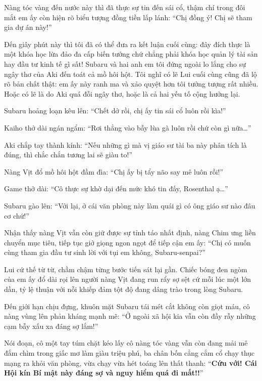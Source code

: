 \documentclass[../main.tex]{subfiles}
\begin{document}

Nàng tóc vàng đến nước này thì đã thực sự tin đến sái cổ, thậm chí trong đôi mắt em ấy còn hiện rõ biểu tượng đồng tiền lấp lánh: ``Chị đồng ý! Chị sẽ tham gia dự án này!''

Đến giây phút này thì tôi đã có thể đưa ra kết luận cuối cùng: đây đích thực là một khóa học lừa đảo đa cấp biến tướng chứ chẳng phải khóa học quản lý tài sản hay đầu tư kinh tế gì sất! Subaru và hai anh em tôi đứng ngoài lo lắng cho sự ngây thơ của Aki đến toát cả mồ hôi hột. Tôi nghĩ có lẽ Lui cuối cùng cũng đã lộ rõ bản chất thật: em ấy này ranh ma và xảo quyệt hơn tôi tưởng tượng rất nhiều. Hoặc có lẽ là do Aki quá đỗi ngây thơ, hoặc là cả hai yếu tố cộng hưởng lại.

Subaru hoảng loạn kêu lên: ``Chết dở rồi, chị ấy tin sái cổ luôn rồi kìa!''

Kaiho thở dài ngán ngẩm: ``Rơi thẳng vào bẫy lùa gà luôn rồi chứ còn gì nữa\dots''

Aki chắp tay thành kính: ``Nếu những gì mà vị giáo sư tài ba này phân tích là đúng, thì chắc chắn tương lai sẽ giàu to!''

Nàng Vịt đổ mồ hôi hột đầm đìa: ``Chị ấy bị tẩy não say mê luôn rồi!''

Game thở dài: ``Cô thực sự khờ dại đến mức khó tin đấy, Rosenthal ạ\dots''

Subaru gào lên: ``Với lại, ở cái văn phòng này làm quái gì có ông giáo sư nào đâu cơ chứ!''

Nhận thấy nàng Vịt vẫn còn giữ được sự tỉnh táo nhất định, nàng Chim ưng liền chuyển mục tiêu, tiếp tục giở giọng ngon ngọt để tiếp cận em ấy: ``Chị có muốn cùng tham gia đầu tư sinh lời với tụi em không, Subaru-senpai?''

Lui cứ thế từ từ, chầm chậm từng bước tiến sát lại gần. Chiếc bóng đen ngòm của em ấy đổ dài rọi lên người nàng Vịt đang run rẩy sợ sệt cứ mỗi lúc một lớn dần, tỷ lệ thuận với nỗi khiếp đảm tột độ đang dâng trào trong lòng Subaru.

Đến giới hạn chịu đựng, khuôn mặt Subaru tái mét cắt không còn giọt máu, cô nàng vùng lên phản kháng mạnh mẽ: ``Ở ngoài xã hội kia vẫn còn đầy rẫy những cạm bẫy xấu xa đáng sợ lắm!''

Nói đoạn, cô một tay túm chặt kéo lấy cô nàng tóc vàng vẫn còn đang mải mê đắm chìm trong giấc mơ làm giàu triệu phú, ba chân bốn cẳng cắm cổ chạy thục mạng ra khỏi văn phòng, vừa chạy vừa hét toáng lên thất thanh: ``\textbf{Cứu với! Cái Hội kín Bí mật này đáng sợ và nguy hiểm quá đi mất!!}''
\end{document}
